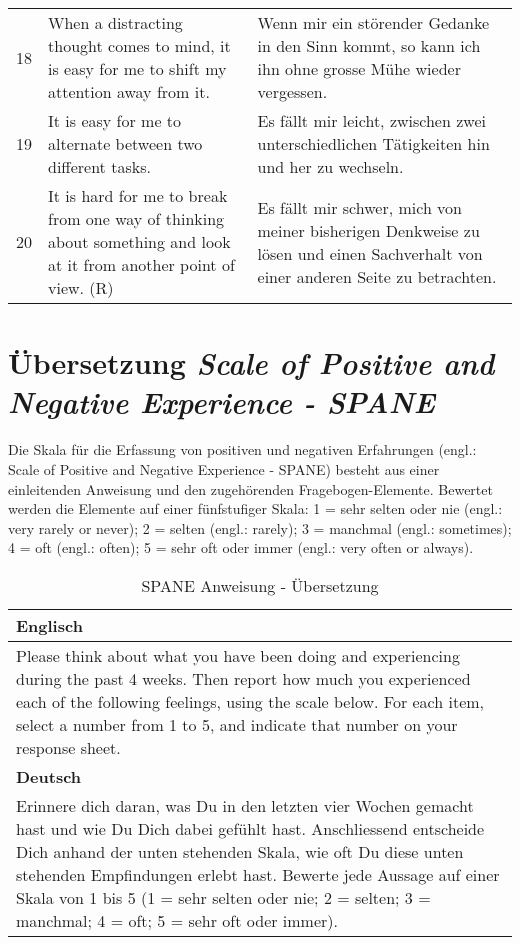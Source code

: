 \begin{center}
\begin{longtable}[t]{|l|p{6.6 cm}|p{6.6 cm}|}
        18 & When a distracting thought comes to mind, it is easy for me to shift my attention away from it. & Wenn mir ein störender Gedanke in den Sinn kommt, so kann ich ihn ohne grosse Mühe wieder vergessen.  \\
        19 & It is easy for me to alternate between two different tasks. & Es fällt mir leicht, zwischen zwei unterschiedlichen Tätigkeiten hin und her zu wechseln. \\
        20 & It is hard for me to break from one way of thinking about something and look at it from another point of view. (R) & Es fällt mir schwer, mich von meiner bisherigen Denkweise zu lösen und einen Sachverhalt von einer anderen Seite zu betrachten. \\ \hline
    \end{longtable}
	\label{tab:AcsUebersetzung}
\end{center}

\section{Übersetzung \textit{Scale of Positive and Negative Experience - SPANE}}\label{appendix.spane}
Die Skala für die Erfassung von positiven und negativen Erfahrungen (engl.: Scale of Positive and Negative Experience - SPANE) \cite{Diener:2010} besteht aus einer einleitenden Anweisung und den zugehörenden Fragebogen-Elemente. Bewertet werden die Elemente auf einer fünfstufiger Skala: 1 = sehr selten oder nie (engl.: very rarely or never); 2 = selten (engl.: rarely); 3 = manchmal (engl.: sometimes); 4 = oft (engl.: often); 5 = sehr oft oder immer (engl.: very often or always). 

\begin{center}
    \begin{longtable}[t]{|p{15 cm}|}
    \caption{SPANE Anweisung - Übersetzung} \\ \hline
        \textbf{Englisch} \\ \hline
        Please think about what you have been doing and experiencing during the past 4 weeks. Then report how much you experienced each of the following feelings, using the scale below. For each item, select a number from 1 to 5, and indicate that number on your response sheet. \\ \hline
        \textbf{Deutsch} \\ \hline 
        Erinnere dich daran, was Du in den letzten vier Wochen gemacht hast und wie Du Dich dabei gefühlt hast. Anschliessend entscheide Dich anhand der unten stehenden Skala, wie oft Du diese unten stehenden Empfindungen erlebt hast. Bewerte jede Aussage auf einer Skala von 1 bis 5 (1 = sehr selten oder nie; 2 = selten; 3 = manchmal; 4 = oft; 5 = sehr oft oder immer). \\ \hline   
    \end{longtable}
	\label{tab:SpaneAnweisung}
\end{center}

